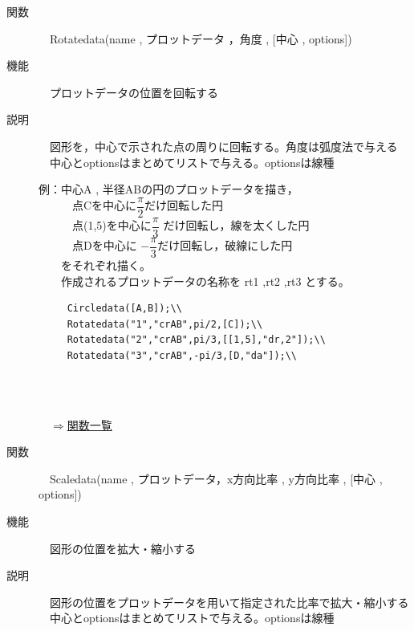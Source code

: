 \documentclass[papersize,a4paper,12pt,uplatex]{jsarticle}
\begin{document}
\begin{description}
\hypertarget{rotatedata}{}
\item[関数]　Rotatedata(name , プロットデータ ，角度 , [中心 , options])
\item[機能]　プロットデータの位置を回転する
\item[説明]　図形を，中心で示された点の周りに回転する。角度は弧度法で与える\\
　中心とoptionsはまとめてリストで与える。optionsは線種\\

\begin{spacing}{1.5}
例：中心A , 半径ABの円のプロットデータを描き，\\
　　　点Cを中心に$\dfrac{\pi}{2} $だけ回転した円\\
　　　点(1,5)を中心に$\dfrac{\pi}{3}$ だけ回転し，線を太くした円\\
　　　点Dを中心に $-\dfrac{\pi}{3} $だけ回転し，破線にした円\\
　　をそれぞれ描く。\\
　　作成されるプロットデータの名称を rt1 ,rt2 ,rt3 とする。
\end{spacing}
\begin{verbatim}
　　　Circledata([A,B]);\\
　　　Rotatedata("1","crAB",pi/2,[C]);\\
　　　Rotatedata("2","crAB",pi/3,[[1,5],"dr,2"]);\\
　　　Rotatedata("3","crAB",-pi/3,[D,"da"]);\\
\end{verbatim}
　\\
　　　　　　

\begin{flushright}　\hyperlink{functionlist}{$\Rightarrow$関数一覧}\end{flushright}

\hypertarget{scaledata}{}
\item[関数]　Scaledata(name , プロットデータ，x方向比率 , y方向比率 , [中心 , options])
\item[機能]　図形の位置を拡大・縮小する
\item[説明]　図形の位置をプロットデータを用いて指定された比率で拡大・縮小する\\
　中心とoptionsはまとめてリストで与える。optionsは線種\\


\end{description}
\end{document}
